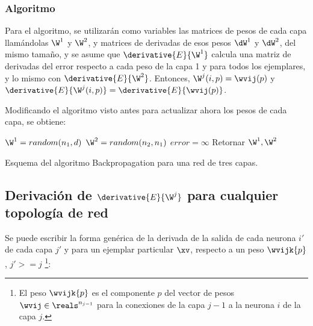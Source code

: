 \subsubsection{Algoritmo}

Para el algoritmo, se utilizarán como variables las matrices de pesos de cada capa llamándolas $\W^1$ y $\W^2$, y matrices de derivadas de esos pesos $\dW^1$ y $\dW^2$, del mismo tamaño, y se asume que $\derivative{E}{\W^1}$ calcula una matriz de derivadas del error respecto a cada peso de la capa 1 y para todos los ejemplares, y lo mismo con $\derivative{E}{\W^2}$. Entonces, $\W^j(i,p)= \wvij(p)$ y $\derivative{E}{\W^j(i,p)}= \derivative{E}{ \wvij(p)}$.

Modificando el algoritmo visto antes para actualizar ahora los pesos de cada capa, se obtiene:

\begin{algorithm}[H]
$\W^1=random(n_1,d)$\;
$\W^2=random(n_2,n_1)$\;
$error=\infty$ \;
Retornar  $\W^1,\W^2$ \;
\caption{Esquema del algoritmo Backpropagation para una red de tres capas.} 
\end{algorithm}
\vspace{10pt}

\subsection{Derivación de $\derivative{E}{\W^j}$ para cualquier topología de red}

Se puede escribir la forma genérica de la derivada de la salida de cada neurona $i'$ de cada capa $j'$ y para un ejemplar particular $\xv$, respecto a un peso $\wvijk{p}$, $j'>=j$ \footnote{El peso $\wvijk{p}$ es el componente $p$ del vector de pesos $\wvij \in \reals^{n_{j-1}}$ para la conexiones de la capa $j-1$ a la neurona $i$ de la capa $j$.}:

